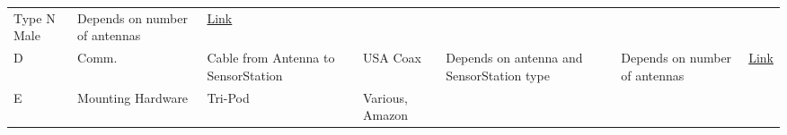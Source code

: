 \documentclass[
]{article}
\begin{document}
\begin{longtable}[]{@{}lllllll@{}}
\begin{minipage}[t]{0.12\columnwidth}
Type N Male\strut
\end{minipage} & \begin{minipage}[t]{0.12\columnwidth}\raggedright
Depends on number of antennas\strut
\end{minipage} & \begin{minipage}[t]{0.12\columnwidth}\raggedright
\href{https://www.data-alliance.net/antenna-433mhz-5dbi-omnidirectional-fiberglass-w-n-male-vhf-uhf-marine/}{Link}\strut
\end{minipage}\tabularnewline
\begin{minipage}[t]{0.12\columnwidth}\raggedright
D\strut
\end{minipage} & \begin{minipage}[t]{0.12\columnwidth}\raggedright
Comm.\strut
\end{minipage} & \begin{minipage}[t]{0.12\columnwidth}\raggedright
Cable from Antenna to SensorStation\strut
\end{minipage} & \begin{minipage}[t]{0.12\columnwidth}\raggedright
USA Coax\strut
\end{minipage} & \begin{minipage}[t]{0.12\columnwidth}\raggedright
Depends on antenna and SensorStation type\strut
\end{minipage} & \begin{minipage}[t]{0.12\columnwidth}\raggedright
Depends on number of antennas\strut
\end{minipage} & \begin{minipage}[t]{0.12\columnwidth}\raggedright
\href{https://usacoax.com/cables.html}{Link}\strut
\end{minipage}\tabularnewline
\begin{minipage}[t]{0.12\columnwidth}\raggedright
E\strut
\end{minipage} & \begin{minipage}[t]{0.12\columnwidth}\raggedright
Mounting Hardware\strut
\end{minipage} & \begin{minipage}[t]{0.12\columnwidth}\raggedright
Tri-Pod\strut
\end{minipage} & \begin{minipage}[t]{0.12\columnwidth}\raggedright
Various, Amazon\strut
\end{minipage} & \begin{minipage}[t]{0.12\columnwidth}\raggedright
\strut
\end{minipage} & \begin{minipage}[t]{0.12\columnwidth}\raggedright

\end{minipage}
\end{longtable}
\end{document}
